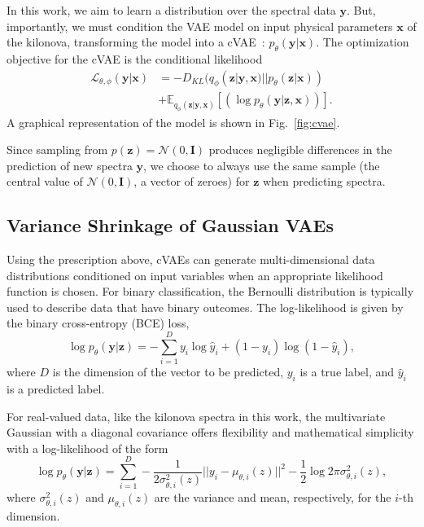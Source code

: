 \documentclass[fleqn,usenatbib,useAMS]{mnras}
\begin{document}
In this work, we aim to learn a distribution over the spectral data $\mathbf{y}$. 
But, importantly, we must condition the VAE model on input physical parameters $\mathbf{x}$ of the kilonova, transforming the model into a cVAE~\citep[][]{sohnLearningStructuredOutput2015, kingmaIntroductionVariationalAutoencoders2019}: $p_{\theta}(\mathbf{y}|\mathbf{x})$.
The optimization objective for the cVAE is the conditional likelihood
\begin{equation}
\begin{aligned}
\mathcal{L}_{\theta, \phi}(\mathbf{y} | \mathbf{x}) &= - D_{KL}(q_{\phi}(\mathbf{z} | \mathbf{y}, \mathbf{x}) || p_{\theta}(\mathbf{z} | \mathbf{x})) \\
&+ \mathbb{E}_{q_{\phi}(\mathbf{z}|\mathbf{y}, \mathbf{x})} [ ( \log p_{\theta}(\mathbf{y | \mathbf{z}, \mathbf{x}}) ) ].
\end{aligned}
\label{eq:cvae_objective}
\end{equation}
A graphical representation of the model is shown in Fig.~\ref{fig:cvae}.

Since sampling from $p(\mathbf{z}) = \mathcal{N}(0, \mathbf{I})$ produces negligible differences in the prediction of new spectra $\mathbf{y}$, we choose to always use the  same sample (the central value of $\mathcal{N}(0, \mathbf{I})$, a vector of zeroes) for $\mathbf{z}$ when predicting spectra.

\subsection{Variance Shrinkage of Gaussian VAEs }
Using the prescription above, cVAEs can generate multi-dimensional data distributions conditioned on input variables when an appropriate likelihood function is chosen.
For binary classification, the Bernoulli distribution is typically used to describe data that have binary outcomes.
The log-likelihood is given by the binary cross-entropy (BCE) loss,
\begin{equation}
    \log p_{\theta}(\mathbf{y | \mathbf{z}}) = -\sum_{i=1}^{D}  y_i \log \hat{y}_i + (1-y_i)\log (1-\hat{y}_i),
    \label{eq:bernoulli_nll}
\end{equation}
\noindent where $D$ is the dimension of the vector to be predicted, $y_i$ is a true label, and $\hat{y}_i$ is a predicted label. 

For real-valued data, like the kilonova spectra in this work, the multivariate Gaussian with a diagonal covariance offers flexibility and mathematical simplicity with a log-likelihood of the form 
\begin{equation}
    \log p_{\theta}(\mathbf{y | \mathbf{z}}) = \sum_{i=1}^{D}  -\frac{1}{2\sigma_{\theta, i}^2(z)} || y_i - \mu_{\theta, i}(z) ||^2 - \frac{1}{2} \log 2 \pi \sigma_{\theta, i}^2(z),
    \label{eq:gauss_nll}
\end{equation}
\noindent where $\sigma_{\theta, i}^2(z)$ and  $\mu_{\theta,i}(z)$ are the variance and mean, respectively, for the $i$-th dimension.
\end{document}

